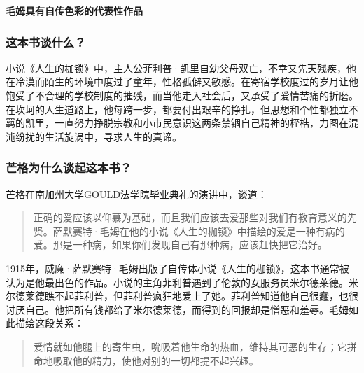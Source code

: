 \cleardoublepage
{}


\begin{BookSummaryBox}
\textbf{毛姆具有自传色彩的代表性作品}
\par
\end{BookSummaryBox}

\subsubsection*{这本书谈什么？}

小说《人生的枷锁》中，主人公菲利普·凯里自幼父母双亡，不幸又先天残疾，他在冷漠而陌生的环境中度过了童年，性格孤僻又敏感。在寄宿学校度过的岁月让他饱受了不合理的学校制度的摧残，而当他走入社会后，又承受了爱情苦痛的折磨。在坎坷的人生道路上，他每跨一步，都要付出艰辛的挣扎，但思想和个性都独立不羁的凯里，一直努力挣脱宗教和小市民意识这两条禁锢自己精神的桎梏，力图在混沌纷扰的生活旋涡中，寻求人生的真谛。
\par

\subsubsection*{芒格为什么谈起这本书？}

芒格在南加州大学GOULD法学院毕业典礼的演讲中，谈道：
\par

\begin{quotation}
正确的爱应该以仰慕为基础，而且我们应该去爱那些对我们有教育意义的先贤。萨默赛特·毛姆在他的小说《人生的枷锁》中描绘的爱是一种有病的爱。那是一种病，如果你们发现自己有那种病，应该赶快把它治好。
\par
\end{quotation}

1915年，威廉·萨默赛特·毛姆出版了自传体小说《人生的枷锁》，这本书通常被认为是他最出色的作品。小说的主角菲利普遇到了伦敦的女服务员米尔德莱德。米尔德莱德瞧不起菲利普，但菲利普疯狂地爱上了她。菲利普知道他自己很蠢，也很讨厌自己。他把所有钱都给了米尔德莱德，而得到的回报却是憎恶和羞辱。毛姆如此描绘这段关系：
\par

\begin{quotation}
爱情就如他腿上的寄生虫，吮吸着他生命的热血，维持其可恶的生存；它拼命地吸取他的精力，使他对别的一切都提不起兴趣。
\par
\end{quotation}

